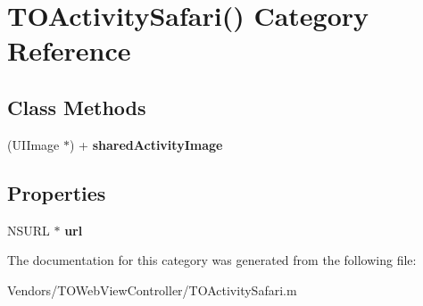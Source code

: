 \hypertarget{category_t_o_activity_safari_07_08}{}\section{T\+O\+Activity\+Safari() Category Reference}
\label{category_t_o_activity_safari_07_08}
\subsection*{Class Methods}
\begin{DoxyCompactItemize}
\item 
\hypertarget{category_t_o_activity_safari_07_08_ab14c6926fca700e4c39adf40b7be5dc5}{}(U\+I\+Image $\ast$) + {\bfseries shared\+Activity\+Image}\label{category_t_o_activity_safari_07_08_ab14c6926fca700e4c39adf40b7be5dc5}

\end{DoxyCompactItemize}
\subsection*{Properties}
\begin{DoxyCompactItemize}
\item 
\hypertarget{category_t_o_activity_safari_07_08_a795c58776a48c9db669a18a67147f808}{}N\+S\+U\+R\+L $\ast$ {\bfseries url}\label{category_t_o_activity_safari_07_08_a795c58776a48c9db669a18a67147f808}

\end{DoxyCompactItemize}


The documentation for this category was generated from the following file\+:\begin{DoxyCompactItemize}
\item 
Vendors/\+T\+O\+Web\+View\+Controller/T\+O\+Activity\+Safari.\+m\end{DoxyCompactItemize}
